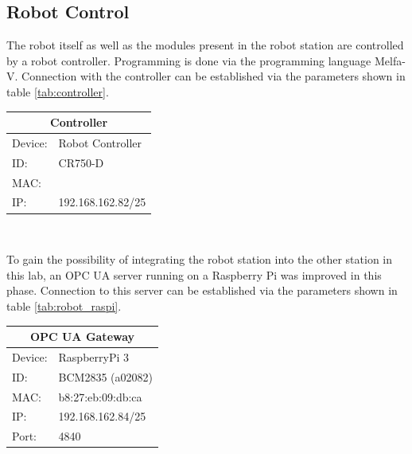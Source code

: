 \documentclass{article}
\begin{document}
\subsection{Robot Control}
The robot itself as well as the modules present in the robot station are controlled by a robot controller. Programming is done via the programming language Melfa-V. Connection with the controller can be established via the parameters shown in table \ref{tab:controller}. 
\begin{center}
		\begin{tabular}[h]{|p{1.2cm}p{5.5cm}|}
			\hline
			\multicolumn{2}{|c|}{\bf Controller}\\
			\hline\hline
			Device: & Robot Controller\\
			\hline
			ID: & CR750-D\\
			\hline
			MAC: & \\
			\hline
			IP: & 192.168.162.82/25\\
			\hline
		\end{tabular} \\
		\label{tab:controller}
\end{center}
To gain the possibility of integrating the robot station into the other station in this lab, an OPC UA server running on a Raspberry Pi was improved in this phase. Connection to this server can be established via the parameters shown in table \ref{tab:robot_raspi}.
\begin{center}
	\setlength\extrarowheight{2pt}
			\begin{tabular}[h]{|p{1.2cm}p{4.5cm}|}
			\hline
			\multicolumn{2}{|c|}{\bf OPC UA Gateway}\\
			\hline\hline
			Device: & RaspberryPi 3\\
			\hline
			ID: & BCM2835 (a02082)\\
			\hline
			MAC: & b8:27:eb:09:db:ca\\
			\hline
			IP: & 192.168.162.84/25\\
			\hline
			Port: & 4840\\
			\hline
		\end{tabular} 
		\label{tab:robot_raspi}
\end{center}
\newpage
\end{document}
